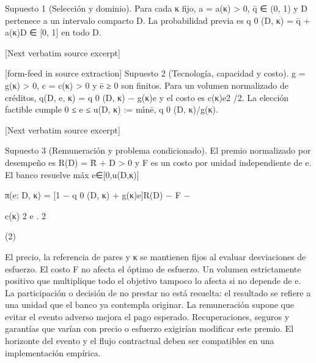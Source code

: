 \documentclass[10pt]{article}
\begin{document}
\begin{ReviewVerbatim}

Supuesto 1 (Selección y dominio). Para cada κ ﬁjo, a = a(κ) > 0, q̄ ∈ (0, 1) y D pertenece a un
intervalo compacto D. La probabilidad previa es q 0 (D, κ) = q̄ + a(κ)D ∈ [0, 1] en todo D.

[Next verbatim source excerpt]


[form-feed in source extraction]
Supuesto 2 (Tecnología, capacidad y costo). g = g(κ) > 0, c = c(κ) > 0 y ē ≥ 0 son ﬁnitos.
Para un volumen normalizado de créditos, q(D, e, κ) = q 0 (D, κ) − g(κ)e y el costo es c(κ)e2 /2. La
elección factible cumple
0 ≤ e ≤ u(D, κ) := mı́n{ē, q 0 (D, κ)/g(κ)}.

[Next verbatim source excerpt]

Supuesto 3 (Remuneración y problema condicionado). El premio normalizado por desempeño es
R(D) = R̄ + D > 0 y F es un costo por unidad independiente de e. El banco resuelve
máx
e∈[0,u(D,κ)]

π(e; D, κ) = [1 − q 0 (D, κ) + g(κ)e]R(D) − F −

c(κ) 2
e .
2

(2)

El precio, la referencia de pares y κ se mantienen ﬁjos al evaluar desviaciones de esfuerzo.
El costo F no afecta el óptimo de esfuerzo. Un volumen estrictamente positivo que multiplique
todo el objetivo tampoco lo afecta si no depende de e. La participación o decisión de no prestar
no está resuelta: el resultado se reﬁere a una unidad que el banco ya contempla originar. La remuneración supone que evitar el evento adverso mejora el pago esperado. Recuperaciones, seguros y
garantías que varían con precio o esfuerzo exigirían modiﬁcar este premio. El horizonte del evento
y el ﬂujo contractual deben ser compatibles en una implementación empírica.
\end{ReviewVerbatim}
\end{document}
